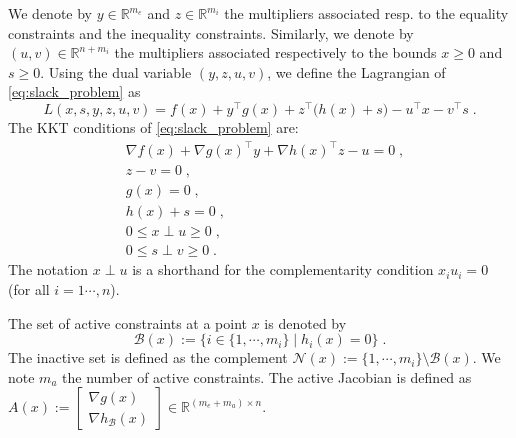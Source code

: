 We denote by $y \in \mathbb{R}^{m_e}$ and $z \in \mathbb{R}^{m_i}$ the multipliers associated
resp. to the equality constraints and the inequality constraints.
Similarly, we denote
by $(u, v) \in \mathbb{R}^{n + m_i}$ the multipliers associated
respectively to the bounds $x \geq 0$ and $s \geq 0$.
Using the dual variable $(y, z, u, v)$, we define the Lagrangian of \eqref{eq:slack_problem} as
\begin{equation}
  \label{eq:lagrangian}
  L(x, s, y, z, u, v) = f(x) + y^\top g(x) + z^\top \big(h(x) +s\big)
  - u^\top x - v^\top s \; .
\end{equation}
The KKT conditions of \eqref{eq:slack_problem} are:
\begin{subequations}
  \label{eq:kktconditions}
    \begin{align}
      & \nabla f(x) + \nabla g(x)^\top y + \nabla h(x)^\top z - u = 0 \; , \\
      & z - v = 0 \; , \\
      & g(x) = 0 \; , \\
      & h(x) + s = 0 \; , \\
      \label{eq:kktconditions:compx}
      & 0 \leq x \perp u \geq 0 \; , \\
      \label{eq:kktconditions:comps}
      & 0 \leq s \perp v \geq 0 \; .
    \end{align}
\end{subequations}
The notation $x \perp u$ is a shorthand for the complementarity
condition $x_i u_i = 0$ (for all $i=1\cdots, n$).

The set of active constraints at a point $x$ is denoted by
\begin{equation}
  \mathcal{B}(x) := \{ i \in\{ 1, \cdots, m_i\} \; | \; h_i(x) = 0 \} \; .
\end{equation}
The inactive set is defined as the complement $\mathcal{N}(x) := \{1, \cdots, m_i \} \setminus \mathcal{B}(x)$.
We note $m_a$ the number of active constraints.
The active Jacobian is defined as $A(x) := \begin{bmatrix} \nabla g(x) \\ \nabla h_{\mathcal{B}}(x) \end{bmatrix} \in \mathbb{R}^{(m_e + m_a) \times n}$.


